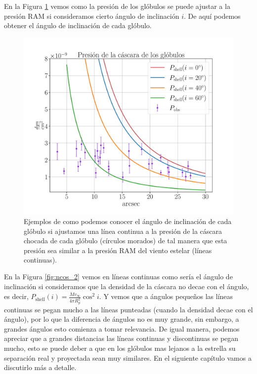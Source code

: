\documentclass{book}
\begin{document}
En la Figura \ref{graf_presion_ang} vemos como la presión de los glóbulos se puede ajustar a la presión RAM si consideramos cierto ángulo de inclinación $i$. De aquí podemos obtener el ángulo de inclinación de cada glóbulo.%

\begin{figure}[htb]
    \centering
    \includegraphics[width=\textwidth]{imagenes_corregidas/S_52.pdf}
    \caption{Ejemplos de como podemos conocer el ángulo de inclinación de cada glóbulo si ajustamos una línea continua a la presión de la cáscara chocada de cada glóbulo (círculos morados) de tal manera que esta presión sea similar a la presión RAM del viento estelar (líneas continuas).}
    \label{graf_presion_ang}
\end{figure}

En la Figura \ref{fig:ncos_2} vemos en líneas continuas como sería el ángulo de inclinación si consideramos que la densidad de la cáscara no decae con el ángulo, es decir, $P_\mathrm{shell}(i)=\frac{\dot{M}v_\infty}{4\pi R_\mathrm{p}^2}\cos^2i$. Y vemos que a ángulos pequeños las líneas continuas se pegan mucho a las líneas punteadas (cuando la densidad decae con el ángulo), por lo que la diferencia de ángulos no es muy grande, sin embargo, a grandes ángulos esto comienza a tomar relevancia. De igual manera, podemos apreciar que a grandes distancias las líneas continuas y discontinuas se pegan mucho, esto se puede deber a que en los glóbulos mas lejanos a la estrella su separación real y proyectada sean muy similares. En el siguiente capítulo vamos a discutirlo más a detalle.
\end{document}
